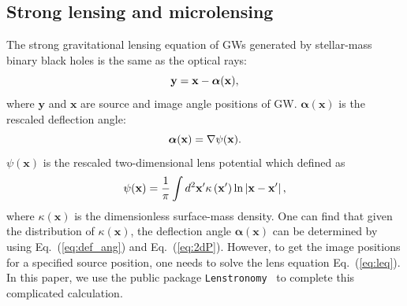 \documentclass[fleqn,usenatbib]{mnras}
\begin{document}
\subsection{Strong lensing and microlensing}
The strong gravitational lensing equation of GWs generated by stellar-mass binary black holes is the same as the optical rays:
\begin{equation}
\label{eq:leq}
\mathbf{y}=\mathbf{x}-\boldsymbol{\alpha}(\mathbf{x}) \\,
\end{equation}
where $\mathbf{y}$ and $\mathbf{x}$ are source and image angle positions of GW.
$\boldsymbol{\alpha}(\mathbf{x})$ is the rescaled deflection angle:
\begin{equation}
\label{eq:def_ang}
\boldsymbol{\alpha}(\mathbf{x})=\nabla \psi(\mathbf{x}) \\.
\end{equation}
$\psi(\mathbf{x})$ is the rescaled two-dimensional lens potential which defined as
\begin{equation}
\label{eq:2dP}
\psi(\mathbf{x})=\frac{1}{\pi} \int d^{2} \mathbf{x}^{\prime} \kappa\left(\mathbf{x}^{\prime}\right) \ln \left|\mathbf{x}-\mathbf{x}^{\prime}\right| \\,
\end{equation}
where $\kappa\left(\mathbf{x}\right)$ is the dimensionless surface-mass density.
One can find that given the distribution of $\kappa\left(\mathbf{x}\right)$, the deflection angle $\boldsymbol{\alpha}(\mathbf{x})$ can be determined by using Eq.~(\ref{eq:def_ang}) and Eq.~(\ref{eq:2dP}).
However, to get the image positions for a specified source position, one needs to solve the lens equation Eq.~(\ref{eq:leq}).
In this paper, we use the public package \texttt{Lenstronomy}~\citep{2018PDU....22..189B, 2021JOSS....6.3283B} to complete this complicated calculation.
\end{document}
